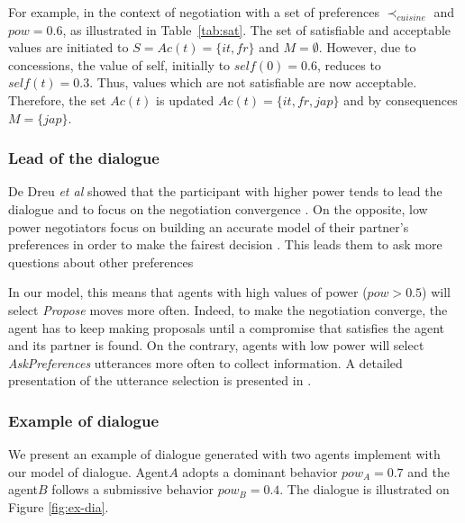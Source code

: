 \documentclass[conference, letterpaper]{IEEEtran}
\begin{document}
	For example, in the context of negotiation with a set of preferences $\prec_{cuisine}$ and $pow= 0.6$, as illustrated in Table~\ref{tab:sat}. The set of satisfiable and acceptable values are initiated to $S=Ac(t)=\{it,fr\}$ and $M= \emptyset$. 
	However, due to concessions, the value of self, initially to $self(0)=0.6$, reduces to $self(t)=0.3$. Thus, values which are not satisfiable are now acceptable. Therefore, the set $Ac(t)$  is updated  $Ac(t)=\{it,fr,jap\}$ and by consequences $M=\{jap\}$. 
	
	\subsubsection{Lead of the dialogue}
	De Dreu \textit{et al} showed that the participant with higher power tends to lead the dialogue and to focus on the negotiation convergence \cite{magee2007power,de2004influence}. On the opposite, low power negotiators focus on building an accurate model of their partner's preferences in order to make the fairest decision \cite{de1995impact}. This leads them to ask more questions about other preferences
	
	In our model, this means that agents with high values of power ($pow>0.5$) will select \emph{Propose} moves more often. Indeed, to make the negotiation converge, the agent has to keep making proposals until a compromise that satisfies the agent and its partner is found.
	On the contrary, agents with low power will select \emph{AskPreferences} utterances more often to collect information. A detailed presentation of the utterance selection is presented in \cite{ouali2017computational}.
		
	
	\subsubsection{Example of dialogue}	
		We present an example of dialogue generated with two agents implement with our model of dialogue. Agent$A$ adopts a dominant behavior $pow_A =0.7$ and the agent$B$ follows a submissive behavior $pow_B =0.4$. The dialogue is illustrated on Figure \ref{fig:ex-dia}.
		
\end{document}
